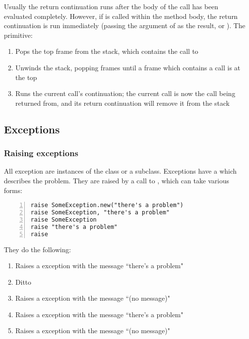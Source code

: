 Usually the return continuation runs after the body of the call has been evaluated completely. However, if  is called within the method body, the return continuation is run immediately (passing the argument of  as the result, or ). The  primitive:

\begin{enumerate}
  \item Pops the top frame from the stack, which contains the call to 
  \item Unwinds the stack, popping frames until a frame which contains a call is at the top
  \item Runs the current call's continuation; the current call is now the call being returned from, and its return continuation will remove it from the stack
\end{enumerate}

\subsection{Exceptions}
\label{sec:exceptions}

\subsubsection{Raising exceptions}

All exception are instances of the  class or a subclass. Exceptions have a  which describes the problem. They are raised by a call to , which can take various forms:

\begin{lstlisting}[numbers=left]
raise SomeException.new("there's a problem")
raise SomeException, "there's a problem"
raise SomeException
raise "there's a problem"
raise
\end{lstlisting}

They do the following:

\begin{enumerate}
  \item Raises a  exception with the message ``there's a problem"
  \item Ditto
  \item Raises a  exception with the message ``(no message)"
  \item Raises a  exception with the message ``there's a problem"
  \item Raises a  exception with the message ``(no message)"
\end{enumerate}


